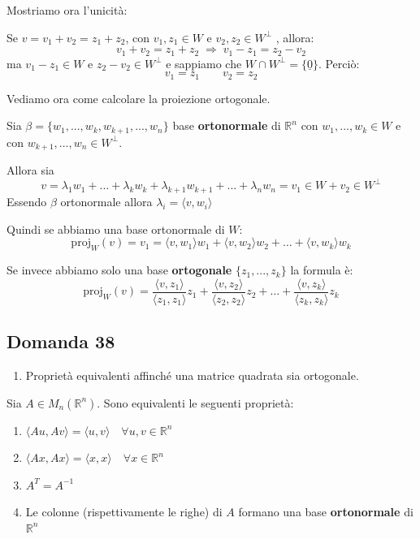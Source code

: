 \documentclass[
  a4paper,
]{article}
\providecommand{\tightlist}{%
  \setlength{\itemsep}{0pt}\setlength{\parskip}{0pt}}
\providecommand{\tightlist}{}
\begin{document}
Mostriamo ora l'unicità:

Se \(v = v_1 + v_2 = z_1 + z_2\), con \(v_1, z_1 \in W\) e
\(v_2, z_2 \in W^{\perp}\) , allora: \[
v_1 + v_2 = z_1 + z_2 \;\Longrightarrow\; v_1 - z_1 = z_2 - v_2
\] ma \(v_1 - z_1 \in W\) e \(z_2 - v_2 \in W^{\perp}\) e sappiamo che
\(W \cap W^{\perp} = \{\underline{0}\}\). Perciò: \[
v_1 = z_1 \qquad v_2 = z_2
\]

\bigskip

Vediamo ora come calcolare la proiezione ortogonale.

Sia \(\beta = \{w_1, ..., w_k, w_{k+1}, ..., w_n\}\) base
\textbf{ortonormale} di \(\mathbb{R}^n\) con \(w_1, ..., w_k \in W\) e
con \(w_{k+1}, ..., w_n \in W^{\perp}\).

Allora sia \[
v = \lambda_1 w_1 +...+ \lambda_k w_k + \lambda_{k+1}w_{k+1} + ... + \lambda_n w_n = v_1 \in W + v_2 \in W^\perp
\] Essendo \(\beta\) ortonormale allora
\(\lambda_i = \langle v, w_i \rangle\)

Quindi se abbiamo una base ortonormale di \(W\): \[
\text{proj}_W(v) = v_1 = \langle v, w_1 \rangle w_1 + \langle v, w_2 \rangle w_2 + \dots + \langle v, w_k \rangle w_k
\]

Se invece abbiamo solo una base \textbf{ortogonale}
\(\{z_1, ..., z_k\}\) la formula è: \[
\text{proj}_W(v) = \frac{\langle v, z_1 \rangle}{\langle z_1, z_1 \rangle}z_1 + \frac{\langle v, z_2 \rangle}{\langle z_2, z_2 \rangle}z_2 + \dots + \frac{\langle v, z_k \rangle}{\langle z_k, z_k \rangle}z_k
\]

\hypertarget{domanda-38}{%
\subsection{Domanda 38}\label{domanda-38}}

\begin{observationbox}[Domanda]
\begin{enumerate}
\def\labelenumi{\arabic{enumi}.}
\setcounter{enumi}{37}
\tightlist
\item
  Proprietà equivalenti affinché una matrice quadrata sia ortogonale.
\end{enumerate}
\end{observationbox}

Sia \(A \in M_n (\mathbb{R}^n)\). Sono equivalenti le seguenti
proprietà:

\begin{enumerate}
\def\labelenumi{\arabic{enumi}.}
\tightlist
\item
  \(\langle Au, Av \rangle = \langle u, v \rangle \quad \forall u, v \in \mathbb{R}^n\)
\item
  \(\langle Ax, Ax \rangle = \langle x, x \rangle \quad \forall x \in \mathbb{R}^n\)
\item
  \(A^T = A^{-1}\)
\item
  Le colonne (rispettivamente le righe) di \(A\) formano una base
  \textbf{ortonormale} di \(\mathbb{R}^n\)
\end{enumerate}
\end{document}
